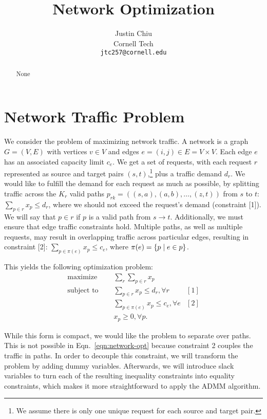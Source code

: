 \documentclass[11pt]{article}
\title{Network Optimization}
\author{Justin Chiu \\
  Cornell Tech \\
  \texttt{jtc257@cornell.edu}}
\begin{document}
\maketitle
\begin{abstract}
None
\end{abstract}

\section{Network Traffic Problem}
We consider the problem of maximizing network traffic.
A network is a graph $G = (V,E)$ with vertices $v\in V$ and edges
$e = (i,j)\in E = V\times V$.
Each edge $e$ has an associated capacity limit $c_e$.
We get a set of requests,
with each request $r$ represented as source and target pairs $(s,t)$,\footnote{
We assume there is only one unique request for each source and target pair.
}
plus a traffic demand $d_r$.
We would like to fulfill the demand for each request as much as possible,
by splitting traffic across the $K_r$ valid paths
$p_{rk} = ((s,a), (a,b), \ldots, (z,t))$ from $s$ to $t$:
$\sum_{p\in r} x_p \le d_r$, where we should not exceed the request's demand
(constraint [1]).
We will say that $p\in r$ if $p$ is a valid path from $s\to t$.
Additionally, we must ensure that edge traffic constraints hold.
Multiple paths, as well as multiple requests, may result in overlapping traffic
across particular edges, resulting in constraint [2]:
$\sum_{p\in\pi(e)} x_{p} \le c_e$,
where $\pi(e) = \left\{p \mid e \in p\right\}$.

This yields the following optimization problem:
\begin{equation}
\label{eqn:network-opt}
\begin{aligned}
\textrm{maximize } \quad & \sum_r \sum_{p\in r} x_p\\
\textrm{subject to } \quad
&\sum_{p \in r}x_p \le d_r, \forall r & [1]\\
&\sum_{p\in\pi(e)} x_p \le c_e, \forall e & [2]\\
& x_p \geq 0, \forall p.
\end{aligned}
\end{equation}

While this form is compact, we would like the problem to
separate over paths. This is not possible in Eqn.~\ref{eqn:network-opt}
because constraint 2 couples the traffic in paths.
In order to decouple this constraint, we will transform the problem by adding dummy variables.
Afterwards, we will introduce slack variables to turn each of the resulting inequality constraints
into equality constraints, which makes it more straightforward to apply the ADMM algorithm.
\end{document}
